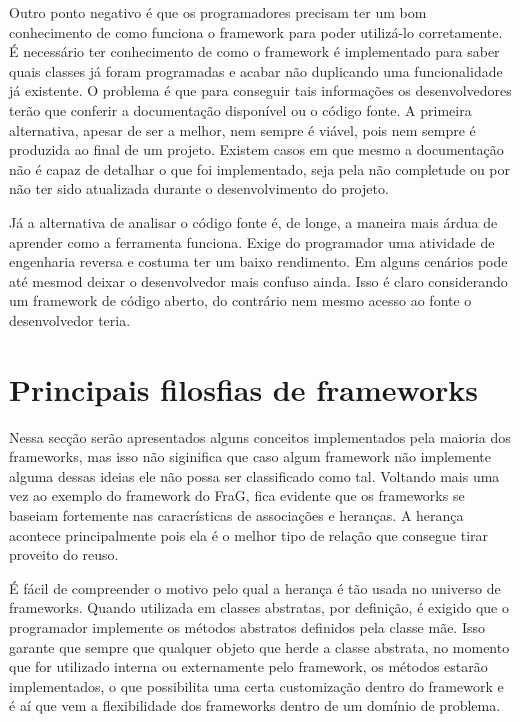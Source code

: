 \documentclass[
    12pt,       %
    openright,      %
    twoside,      %
    a4paper,      %
    english,      %
    french,       %
    spanish,      %
    brazil,       %
    ]{abntex2}
\begin{document}
          Outro ponto negativo é que os programadores precisam ter um bom conhecimento
          de como funciona o framework para poder utilizá-lo corretamente. É necessário
          ter conhecimento de como o framework é implementado para saber quais classes
          já foram programadas e acabar não duplicando uma funcionalidade já existente.
          O problema é que para conseguir tais informações os desenvolvedores terão que
          conferir a documentação disponível ou o código fonte. A primeira alternativa,
          apesar de ser a melhor, nem sempre é viável, pois nem sempre é produzida ao
          final de um projeto. Existem casos em que mesmo a documentação não é capaz
          de detalhar o que foi implementado, seja pela não completude ou por não ter
          sido atualizada durante o desenvolvimento do projeto.

          Já a alternativa de analisar o código fonte é, de longe, a maneira mais árdua
          de aprender como a ferramenta funciona. Exige do programador uma atividade
          de engenharia reversa e costuma ter um baixo rendimento. Em alguns cenários
          pode até mesmod deixar o desenvolvedor mais confuso ainda. Isso é claro
          considerando um framework de código aberto, do contrário nem mesmo acesso
          ao fonte o desenvolvedor teria.

      \section{Principais filosfias de frameworks}
          Nessa secção serão apresentados alguns conceitos implementados pela maioria
          dos frameworks, mas isso não siginifica que caso algum framework não implemente
          alguma dessas ideias ele não possa ser classificado como tal. Voltando mais uma
          vez ao exemplo do framework do FraG, fica evidente que os frameworks se baseiam
          fortemente nas caracrísticas de associações e heranças. A herança acontece
          principalmente pois ela é o melhor tipo de relação que consegue tirar proveito
          do reuso.

          É fácil de compreender o motivo pelo qual a herança é tão usada no universo de
          frameworks. Quando utilizada em classes abstratas, por definição, é exigido que
          o programador implemente os métodos abstratos definidos pela classe mãe. Isso
          garante que sempre que qualquer objeto que herde a classe abstrata, no momento
          que for utilizado interna ou externamente pelo framework, os métodos estarão
          implementados, o que possibilita uma certa customização dentro do framework e
          é aí que vem a flexibilidade dos frameworks dentro de um domínio de problema.
\end{document}
